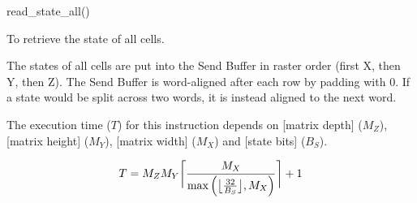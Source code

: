 

\format

read\_state\_all()

\purpose

To retrieve the state of all cells.

\description

The states of all cells are put into the Send Buffer in raster order (first X, then Y, then Z).
The Send Buffer is word-aligned after each row by padding with 0.
If a state would be split across two words, it is instead aligned to the next word.

\notes

The execution time ($T$) for this instruction depends on [matrix depth] ($M_Z$), [matrix height] ($M_Y$), [matrix width] ($M_X$) and [state bits] ($B_S$).

$$ T = M_Z M_Y \ceil[\bigg]{ \frac{M_X}{\max \left( \floor[\big]{ \frac{32}{B_S} }, M_X \right)} } + 1 $$
